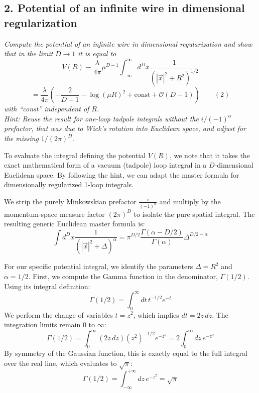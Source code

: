 \subsection*{2. Potential of an infinite wire in dimensional regularization}

\begin{center}
    \textit{Compute the potential of an infinite wire in dimensional regularization and show that in the limit } $D \to 1$ \textit{ it is equal to}
    \[
        V(R) \equiv \frac{\lambda}{4\pi} \mu^{D-1} \int_{-\infty}^\infty d^Dx \frac{1}{(|\vec{x}|^2 + R^2)^{1/2}}
    \]
    \[
        = \frac{\lambda}{4\pi} \left( -\frac{2}{D-1} - \log(\mu R)^2 + \text{const} + \mathcal{O}(D-1) \right) \qquad (2)
    \]
    \textit{with ``const'' independent of $R$.} \\
    \textit{Hint: Reuse the result for one-loop tadpole integrals without the } $i/(-1)^\alpha$ \textit{ prefactor, that was due to Wick's rotation into Euclidean space, and adjust for the missing } $1/(2\pi)^D$.
\end{center}

To evaluate the integral defining the potential $V(R)$, we note that it takes the exact mathematical form of a vacuum (tadpole) loop integral in a $D$-dimensional Euclidean space. By following the hint, we can adapt the master formula for dimensionally regularized 1-loop integrals.

We strip the purely Minkowskian prefactor $\frac{i}{(-1)^\alpha}$ and multiply by the momentum-space measure factor $(2\pi)^D$ to isolate the pure spatial integral. The resulting generic Euclidean master formula is:
\[
    \int d^Dx \frac{1}{(|\vec{x}|^2 + \Delta)^\alpha} = \pi^{D/2} \frac{\Gamma(\alpha - D/2)}{\Gamma(\alpha)} \Delta^{D/2 - \alpha}
\]

For our specific potential integral, we identify the parameters $\Delta = R^2$ and $\alpha = 1/2$. First, we compute the Gamma function in the denominator, $\Gamma(1/2)$. Using its integral definition:
\[
    \Gamma(1/2) = \int_0^\infty dt \, t^{-1/2} e^{-t}
\]
We perform the change of variables $t = z^2$, which implies $dt = 2z \, dz$. The integration limits remain $0$ to $\infty$:
\[
    \Gamma(1/2) = \int_0^\infty (2z \, dz) (z^2)^{-1/2} e^{-z^2} = 2 \int_0^\infty dz \, e^{-z^2}
\]
By symmetry of the Gaussian function, this is exactly equal to the full integral over the real line, which evaluates to $\sqrt{\pi}$:
\[
    \Gamma(1/2) = \int_{-\infty}^{+\infty} dz \, e^{-z^2} = \sqrt{\pi}
\]

